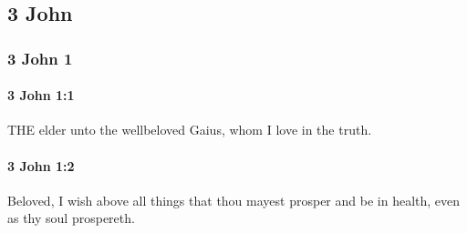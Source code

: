 \subsection{3 John}
	\label{3JOHN}

	\subsubsection{3 John 1} %
		\label{3JOHN-1}
	
		\paragraph{3 John 1:1} %
			\label{3JOHN-1-1}

			THE elder unto the wellbeloved Gaius, whom I love in the truth.

			\begin{framed}
			\scriptsize
				\begin{compactdesc}
					\item[SBLG] 
				\end{compactdesc}
			\end{framed}

		\paragraph{3 John 1:2} %
			\label{3JOHN-1-2}

			Beloved, I wish above all things that thou mayest prosper and be in health, even as thy soul prospereth.


